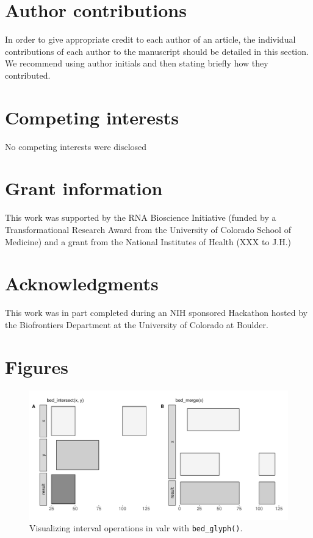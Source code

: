 \documentclass[9pt,a4paper]{extarticle}
\begin{document}
\section*{Author contributions}
In order to give appropriate credit to each author of an article, the individual
contributions of each author to the manuscript should be detailed in this section. We
recommend using author initials and then stating briefly how they contributed.

\section*{Competing interests}
No competing interests were disclosed

\section*{Grant information}
This work was supported by the RNA Bioscience Initiative (funded by a Transformational Research Award from the University of Colorado School of Medicine) and a grant from the National Institutes of Health (XXX to J.H.)

\section*{Acknowledgments}
This work was in part completed during an NIH sponsored Hackathon hosted by the Biofrontiers Department at the University of Colorado at Boulder. 

{\small
}

\section*{Figures}


\begin{figure}[!htb]
\centering
\includegraphics[width=1\textwidth]{figure1.pdf}
\caption{\label{fig:Figure 1}Visualizing interval operations in valr with \texttt{bed\_glyph()}.} 
\end{figure}
\end{document}

